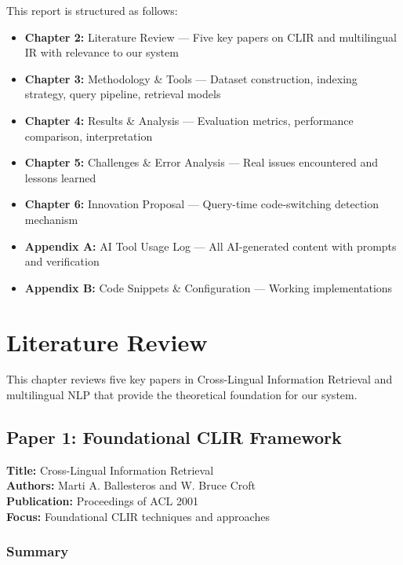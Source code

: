 \documentclass[12pt,a4paper]{report}
\begin{document}
This report is structured as follows:
\begin{itemize}
    \item \textbf{Chapter 2:} Literature Review --- Five key papers on CLIR and multilingual IR with relevance to our system
    \item \textbf{Chapter 3:} Methodology \& Tools --- Dataset construction, indexing strategy, query pipeline, retrieval models
    \item \textbf{Chapter 4:} Results \& Analysis --- Evaluation metrics, performance comparison, interpretation
    \item \textbf{Chapter 5:} Challenges \& Error Analysis --- Real issues encountered and lessons learned
    \item \textbf{Chapter 6:} Innovation Proposal --- Query-time code-switching detection mechanism
    \item \textbf{Appendix A:} AI Tool Usage Log --- All AI-generated content with prompts and verification
    \item \textbf{Appendix B:} Code Snippets \& Configuration --- Working implementations
\end{itemize}

\newpage

\chapter{Literature Review}

This chapter reviews five key papers in Cross-Lingual Information Retrieval and multilingual NLP that provide the theoretical foundation for our system.

\section{Paper 1: Foundational CLIR Framework}

\textbf{Title:} Cross-Lingual Information Retrieval \\
\textbf{Authors:} Marti A. Ballesteros and W. Bruce Croft \\
\textbf{Publication:} Proceedings of ACL 2001 \\
\textbf{Focus:} Foundational CLIR techniques and approaches

\subsection*{Summary}
\end{document}
